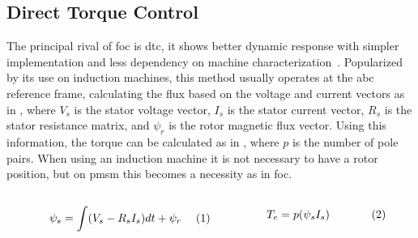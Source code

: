 \subsection{Direct Torque Control}
The principal rival of \gls{foc} is \gls{dtc}, it shows better dynamic response with simpler implementation and less dependency on machine characterization~\cite{Hoang:FOC_vs_DTC_induction:1999}. Popularized by its use on induction machines, this method usually operates at the abc reference frame, calculating the flux based on the voltage and current vectors as in , where $V_s$ is the stator voltage vector, $I_s$ is the stator current vector, $R_s$ is the stator resistance matrix, and $\psi_r$ is the rotor magnetic flux vector. Using this information, the torque can be calculated as in , where $p$ is the number of pole pairs. When using an induction machine it is not necessary to have a rotor position, but on \gls{pmsm} this becomes a necessity as in \gls{foc}.

\begin{subequations}
	\begin{minipage}{.45\linewidth}
        \begin{equation}
            \psi_s = \int (V_s -R_s I_s)dt + \psi_r
            \label{eq:dtc_flux}
        \end{equation}
    \end{minipage}
    \begin{minipage}{.45\linewidth}
        \begin{equation}
            T_e = p(\psi_s I_s)
            \label{eq:dtc_tq}
        \end{equation}
    \end{minipage}
\end{subequations}

